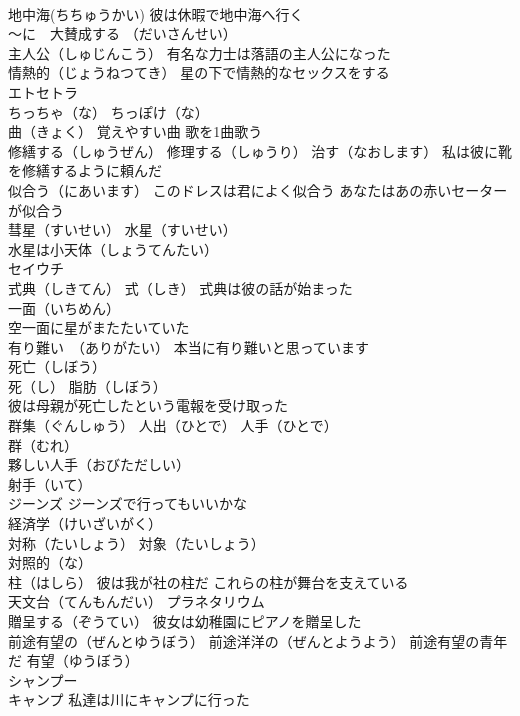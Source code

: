 \documentclass[8pt]{extreport}
\begin{document}
\begin{CJK}{UTF8}{min}
\\	地中海(ちちゅうかい) 彼は休暇で地中海へ行く
\\	～に　大賛成する （だいさんせい）
\\	主人公（しゅじんこう） 有名な力士は落語の主人公になった
\\	情熱的（じょうねつてき） 星の下で情熱的なセックスをする
\\	エトセトラ
\\	ちっちゃ（な） ちっぽけ（な）
\\	曲（きょく） 覚えやすい曲 歌を1曲歌う
\\	修繕する（しゅうぜん） 修理する（しゅうり） 治す（なおします） 私は彼に靴を修繕するように頼んだ
\\	似合う（にあいます） このドレスは君によく似合う あなたはあの赤いセーターが似合う
\\	彗星（すいせい） 水星（すいせい）
\\	水星は小天体（しょうてんたい）
\\	セイウチ
\\	式典（しきてん） 式（しき） 式典は彼の話が始まった
\\	一面（いちめん） 
\\	空一面に星がまたたいていた
\\	有り難い　（ありがたい） 本当に有り難いと思っています
\\	死亡（しぼう）
\\	死（し） 脂肪（しぼう）
\\	彼は母親が死亡したという電報を受け取った
\\	群集（ぐんしゅう） 人出（ひとで） 人手（ひとで）
\\	群（むれ）
\\	夥しい人手（おびただしい）
\\	射手（いて）
\\	ジーンズ ジーンズで行ってもいいかな
\\	経済学（けいざいがく）
\\	対称（たいしょう） 対象（たいしょう）
\\	対照的（な）
\\	柱（はしら） 彼は我が社の柱だ これらの柱が舞台を支えている
\\	天文台（てんもんだい） プラネタリウム
\\	贈呈する（ぞうてい） 彼女は幼稚園にピアノを贈呈した
\\	前途有望の（ぜんとゆうぼう） 前途洋洋の（ぜんとようよう） 前途有望の青年だ 有望（ゆうぼう）
\\	シャンプー
\\	キャンプ 私達は川にキャンプに行った

\end{CJK}
\end{document}
